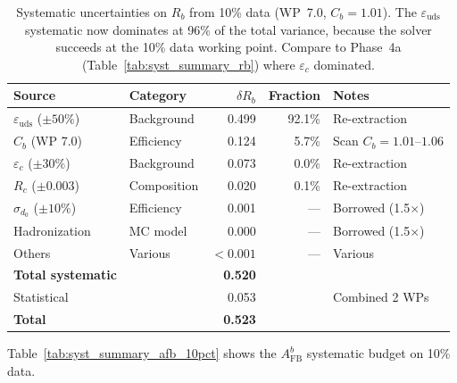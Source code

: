\documentclass[11pt,a4paper]{article}
\begin{document}
\begin{table}[htbp]
\centering
\caption{Systematic uncertainties on $R_b$ from 10\% data (WP~7.0, $C_b = 1.01$).
The $\varepsilon_\mathrm{uds}$ systematic now dominates at 96\% of the total variance,
because the solver succeeds at the 10\% data working point. Compare to Phase~4a
(Table~\ref{tab:syst_summary_rb}) where $\varepsilon_c$ dominated.}
\label{tab:syst_summary_rb_10pct}
\small
\begin{tabular}{llrrl}
\toprule
Source & Category & $\delta R_b$ & Fraction & Notes \\
\midrule
$\varepsilon_\mathrm{uds}$ ($\pm 50\%$) & Background & 0.499 & 92.1\% & Re-extraction \\
$C_b$ (WP 7.0) & Efficiency & 0.124 & 5.7\% & Scan $C_b = 1.01$--$1.06$ \\
$\varepsilon_c$ ($\pm 30\%$) & Background & 0.073 & 0.0\% & Re-extraction \\
$R_c$ ($\pm 0.003$) & Composition & 0.020 & 0.1\% & Re-extraction \\
$\sigma_{d_0}$ ($\pm 10\%$) & Efficiency & 0.001 & --- & Borrowed (1.5$\times$) \\
Hadronization & MC model & 0.000 & --- & Borrowed (1.5$\times$) \\
Others & Various & $< 0.001$ & --- & Various \\
\midrule
\textbf{Total systematic} & & \textbf{0.520} & & \\
Statistical & & 0.053 & & Combined 2 WPs \\
\midrule
\textbf{Total} & & \textbf{0.523} & & \\
\bottomrule
\end{tabular}
\end{table}

Table~\ref{tab:syst_summary_afb_10pct} shows the $A_\mathrm{FB}^b$ systematic budget
on 10\% data.
\end{document}

